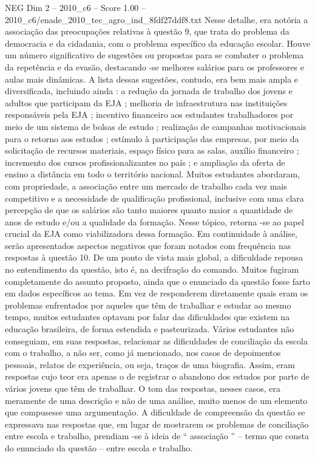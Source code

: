 \begin{textsample}{NEG Dim 2 – 2010\_c6 – Score 1.00 – 2010\_c6/enade\_2010\_tec\_agro\_ind\_8fdf27ddf8.txt}
Nesse detalhe, era notória a associação das preocupações relativas à questão 9, que trata do problema da democracia e da cidadania, com o problema específico da educação escolar.
Houve um número significativo de sugestões ou propostas para se combater o problema da repetência e da evasão, destacando -se melhores salários para os professores e aulas mais dinâmicas.
A lista dessas sugestões, contudo, era bem mais ampla e diversificada, incluindo ainda : a redução da jornada de trabalho dos jovens e adultos que participam da EJA ; melhoria de infraestrutura nas instituições responsáveis pela EJA ; incentivo financeiro aos estudantes trabalhadores por meio de um sistema de bolsas de estudo ; realização de campanhas motivacionais para o retorno aos estudos ; estímulo à participação das empresas, por meio da solicitação de recursos materiais, espaço físico para as salas, auxílio financeiro ; incremento dos cursos profissionalizantes no país ; e ampliação da oferta de ensino a distância em todo o território nacional.
Muitos estudantes abordaram, com propriedade, a associação entre um mercado de trabalho cada vez mais competitivo e a necessidade de qualificação profissional, inclusive com uma clara percepção de que os salários são tanto maiores quanto maior a quantidade de anos de estudo e/ou a qualidade da formação.
Nesse tópico, retorna -se ao papel crucial da EJA como viabilizadora dessa formação.
Em continuidade à análise, serão apresentados aspectos negativos que foram notados com frequência nas respostas à questão 10.
De um ponto de vista mais global, a dificuldade repousa no entendimento da questão, isto é, na decifração do comando.
Muitos fugiram completamente do assunto proposto, ainda que o enunciado da questão fosse farto em dados específicos ao tema.
Em vez de responderem diretamente quais eram os problemas enfrentados por aqueles que têm de trabalhar e estudar ao mesmo tempo, muitos estudantes optavam por falar das dificuldades que existem na educação brasileira, de forma estendida e pasteurizada.
Vários estudantes não conseguiam, em suas respostas, relacionar as dificuldades de conciliação da escola com o trabalho, a não ser, como já mencionado, nos casos de depoimentos pessoais, relatos de experiência, ou seja, traços de uma biografia.
Assim, eram respostas cujo teor era apenas o de registrar o abandono dos estudos por parte de vários jovens que têm de trabalhar.
O tom das respostas, nesses casos, era meramente de uma descrição e não de uma análise, muito menos de um elemento que compusesse uma argumentação.
A dificuldade de compreensão da questão se expressava nas respostas que, em lugar de mostrarem os problemas de conciliação entre escola e trabalho, prendiam -se à ideia de “ associação ” – termo que consta do enunciado da questão – entre escola e trabalho.

\end{textsample}
